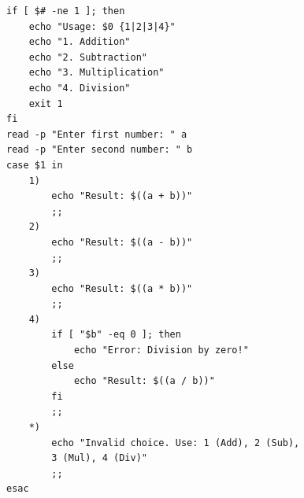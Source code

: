 \begin{verbatim}
if [ $# -ne 1 ]; then
    echo "Usage: $0 {1|2|3|4}"
    echo "1. Addition"
    echo "2. Subtraction"
    echo "3. Multiplication"
    echo "4. Division"
    exit 1
fi
read -p "Enter first number: " a
read -p "Enter second number: " b
case $1 in
    1)
        echo "Result: $((a + b))"
        ;;
    2)
        echo "Result: $((a - b))"
        ;;
    3)
        echo "Result: $((a * b))"
        ;;
    4)
        if [ "$b" -eq 0 ]; then
            echo "Error: Division by zero!"
        else
            echo "Result: $((a / b))"
        fi
        ;;
    *)
        echo "Invalid choice. Use: 1 (Add), 2 (Sub), 
        3 (Mul), 4 (Div)"
        ;;
esac
\end{verbatim}